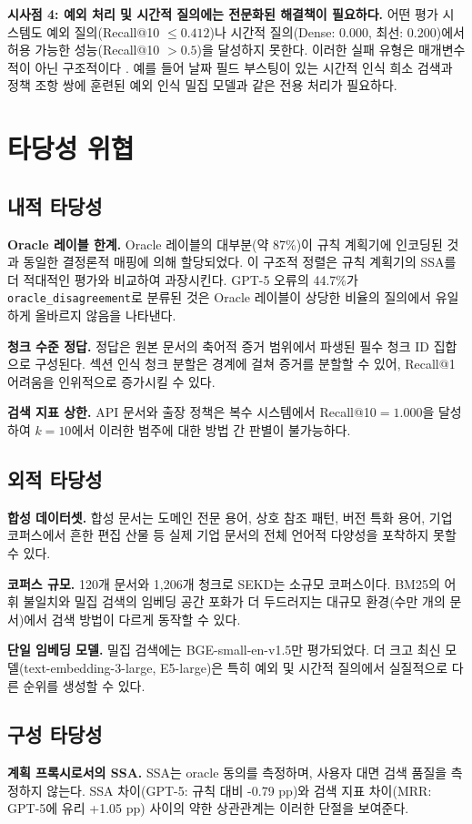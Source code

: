 \textbf{시사점 4: 예외 처리 및 시간적 질의에는 전문화된 해결책이 필요하다.} 어떤 평가 시스템도 예외 질의(Recall@10 $\leq{0.412}$)나 시간적 질의(Dense: 0.000, 최선: 0.200)에서 허용 가능한 성능(Recall@10 $>{0.5}$)을 달성하지 못한다. 이러한 실패 유형은 매개변수적이 아닌 구조적이다 \citep{manning2008ir}. 예를 들어 날짜 필드 부스팅이 있는 시간적 인식 희소 검색과 정책 조항 쌍에 훈련된 예외 인식 밀집 모델과 같은 전용 처리가 필요하다.

\section{타당성 위협}
\label{sec:disc_threats_ko}

\subsection{내적 타당성}

\textbf{Oracle 레이블 한계.} Oracle 레이블의 대부분(약 87\%)이 규칙 계획기에 인코딩된 것과 동일한 결정론적 매핑에 의해 할당되었다. 이 구조적 정렬은 규칙 계획기의 SSA를 더 적대적인 평가와 비교하여 과장시킨다. GPT-5 오류의 44.7\%가 \texttt{oracle\_disagreement}로 분류된 것은 Oracle 레이블이 상당한 비율의 질의에서 유일하게 올바르지 않음을 나타낸다.

\textbf{청크 수준 정답.} 정답은 원본 문서의 축어적 증거 범위에서 파생된 필수 청크 ID 집합으로 구성된다. 섹션 인식 청크 분할은 경계에 걸쳐 증거를 분할할 수 있어, Recall@1 어려움을 인위적으로 증가시킬 수 있다.

\textbf{검색 지표 상한.} API 문서와 출장 정책은 복수 시스템에서 Recall@10$={1.000}$을 달성하여 $k{=}10$에서 이러한 범주에 대한 방법 간 판별이 불가능하다.

\subsection{외적 타당성}

\textbf{합성 데이터셋.} 합성 문서는 도메인 전문 용어, 상호 참조 패턴, 버전 특화 용어, 기업 코퍼스에서 흔한 편집 산물 등 실제 기업 문서의 전체 언어적 다양성을 포착하지 못할 수 있다.

\textbf{코퍼스 규모.} 120개 문서와 1,206개 청크로 SEKD는 소규모 코퍼스이다. BM25의 어휘 불일치와 밀집 검색의 임베딩 공간 포화가 더 두드러지는 대규모 환경(수만 개의 문서)에서 검색 방법이 다르게 동작할 수 있다.

\textbf{단일 임베딩 모델.} 밀집 검색에는 BGE-small-en-v1.5만 평가되었다. 더 크고 최신 모델(text-embedding-3-large, E5-large)은 특히 예외 및 시간적 질의에서 실질적으로 다른 순위를 생성할 수 있다.

\subsection{구성 타당성}

\textbf{계획 프록시로서의 SSA.} SSA는 oracle 동의를 측정하며, 사용자 대면 검색 품질을 측정하지 않는다. SSA 차이(GPT-5: 규칙 대비 -0.79 pp)와 검색 지표 차이(MRR: GPT-5에 유리 +1.05 pp) 사이의 약한 상관관계는 이러한 단절을 보여준다.
